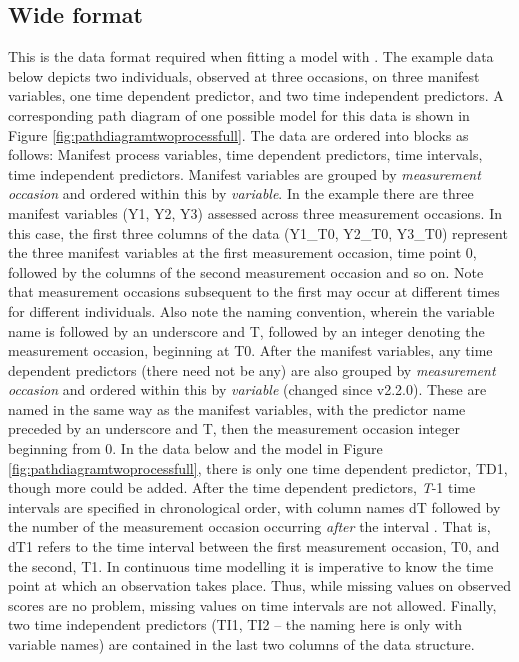 \documentclass[nojss]{jss}\usepackage[]{graphicx}\usepackage[]{color}
\begin{document}
\subsection{Wide format} \label{sec:datawide}\nopagebreak 
This is the data format required when fitting a model with . The example data below depicts two individuals, observed at three occasions, on three manifest variables, one time dependent predictor, and two time independent predictors. A corresponding path diagram of one possible model for this data is shown in Figure \ref{fig:pathdiagramtwoprocessfull}. The data are ordered into blocks as follows: Manifest process variables, time dependent predictors, time intervals, time independent predictors. Manifest variables are grouped by \textit{measurement occasion} and ordered within this by \textit{variable}. In the example there are three manifest variables (Y1, Y2, Y3) assessed across three measurement occasions. In this case, the first three columns of the data (Y1\_T0, Y2\_T0, Y3\_T0) represent the three manifest variables at the first measurement occasion, time point 0, followed by the columns of the second measurement occasion and so on. Note that measurement occasions subsequent to the first may occur at different times for different individuals.  Also note the naming convention, wherein the variable name is followed by an underscore and T, followed by an integer denoting the measurement occasion, beginning at T0.  After the manifest variables, any time dependent predictors (there need not be any) are also grouped by \textit{measurement occasion} and ordered within this by \textit{variable} (changed since v2.2.0). These are named in the same way as the manifest variables, with the predictor name preceded by an underscore and T, then the measurement occasion integer beginning from 0. In the data below and the model in Figure \ref{fig:pathdiagramtwoprocessfull}, there is only one time dependent predictor, TD1, though more could be added. After the time dependent predictors, \textit{T}-1 time intervals are specified in chronological order, with column names dT followed by the number of the measurement occasion occurring \textit{after} the interval . That is, dT1 refers to the time interval between the first measurement occasion, T0, and the second, T1.  In continuous time modelling it is imperative to know the time point at which an observation takes place. Thus, while missing values on observed scores are no problem, missing values on time intervals are not allowed. Finally, two time independent predictors (TI1, TI2 -- the naming here is only with variable names) are contained in the last two columns of the data structure.
\end{document}
